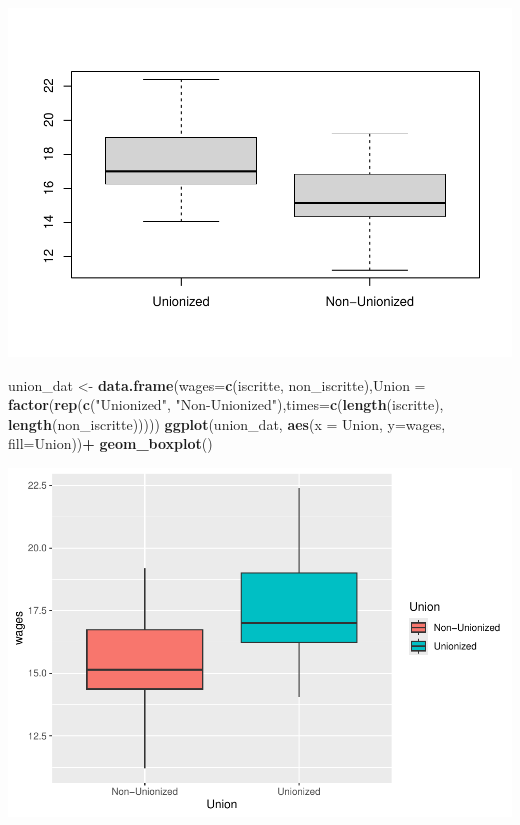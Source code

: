 \documentclass[
]{article}
\newenvironment{Shaded}{\begin{snugshade}}{\end{snugshade}}
\newcommand{\AttributeTok}[1]{\textcolor[rgb]{0.13,0.29,0.53}{#1}}
\newcommand{\FunctionTok}[1]{\textcolor[rgb]{0.13,0.29,0.53}{\textbf{#1}}}
\newcommand{\NormalTok}[1]{#1}
\newcommand{\OtherTok}[1]{\textcolor[rgb]{0.56,0.35,0.01}{#1}}
\newcommand{\SpecialCharTok}[1]{\textcolor[rgb]{0.81,0.36,0.00}{\textbf{#1}}}
\newcommand{\StringTok}[1]{\textcolor[rgb]{0.31,0.60,0.02}{#1}}
\begin{document}
\includegraphics{Estimation-and-Confidence-intervals_files/figure-latex/unnamed-chunk-29-1.pdf}

\begin{Shaded}
\begin{Highlighting}[]
\NormalTok{union\_dat }\OtherTok{\textless{}{-}} \FunctionTok{data.frame}\NormalTok{(}\AttributeTok{wages=}\FunctionTok{c}\NormalTok{(iscritte, non\_iscritte),}\AttributeTok{Union =} \FunctionTok{factor}\NormalTok{(}\FunctionTok{rep}\NormalTok{(}\FunctionTok{c}\NormalTok{(}\StringTok{"Unionized"}\NormalTok{, }\StringTok{"Non{-}Unionized"}\NormalTok{),}\AttributeTok{times=}\FunctionTok{c}\NormalTok{(}\FunctionTok{length}\NormalTok{(iscritte), }\FunctionTok{length}\NormalTok{(non\_iscritte)))))}
\FunctionTok{ggplot}\NormalTok{(union\_dat, }\FunctionTok{aes}\NormalTok{(}\AttributeTok{x =}\NormalTok{ Union, }\AttributeTok{y=}\NormalTok{wages, }\AttributeTok{fill=}\NormalTok{Union))}\SpecialCharTok{+}
  \FunctionTok{geom\_boxplot}\NormalTok{()}
\end{Highlighting}
\end{Shaded}

\includegraphics{Estimation-and-Confidence-intervals_files/figure-latex/unnamed-chunk-29-2.pdf}
\end{document}
